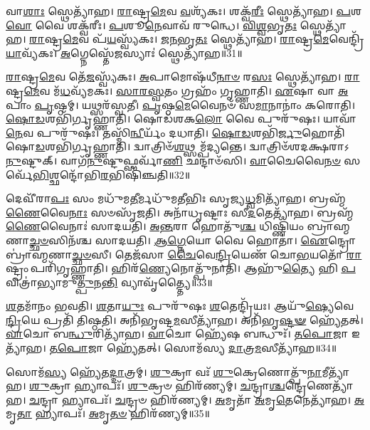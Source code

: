 𑌵𑌾\-\ul{𑌶𑌾𑌃} 𑌸𑍍𑌥𑍇𑌤𑍍𑌯𑌾᳴𑌹।
\-\ul{𑌰𑌾}\-𑌷𑍍𑌟𑍍𑌰\-\ul{𑌮𑍇}\-𑌵 \ul{𑌵}\-𑌶𑍍𑌯᳴𑌕𑌃।
𑌶𑌕𑍍𑌵᳴\-\ul{𑌰𑍀𑌃} 𑌸𑍍𑌥𑍇𑌤𑍍𑌯𑌾᳴𑌹।
\-\ul{𑌪}\-𑌶\-\ul{𑌵𑍋} 𑌵𑍈 𑌶𑌕𑍍𑌵᳴𑌰𑍀𑌃।
\-\ul{𑌪}\-𑌶𑍂\-\ul{𑌨𑍇}\-𑌵𑌾𑌵᳴ 𑌰𑍁𑌨𑍍𑌧𑍇।
\-\ul{𑌵𑌿}\-\-\ul{𑌶𑍍𑌵}\-𑌭𑍃\-\ul{𑌤𑌃} 𑌸𑍍𑌥𑍇𑌤𑍍𑌯𑌾᳴𑌹।
\-\ul{𑌰𑌾}\-𑌷𑍍𑌟𑍍𑌰\-\ul{𑌮𑍇}\-𑌵 𑌪᳴\-\ul{𑌯}\-𑌸𑍍𑌵𑍍𑌯᳴𑌕𑌃।
\-\ul{𑌜}\-\-\ul{𑌨}\-𑌭𑍃\-\ul{𑌤𑌃} 𑌸𑍍𑌥𑍇𑌤𑍍𑌯𑌾᳴𑌹।
\-\ul{𑌰𑌾}\-𑌷𑍍𑌟𑍍𑌰\-\ul{𑌮𑍇}\-𑌵𑍇𑌨𑍍𑌦𑍍𑌰𑌿᳴\-\ul{𑌯𑌾}\-𑌵𑍍𑌯᳴𑌕𑌃।
\-\ul{𑌅}\-𑌗𑍍𑌨𑍇𑌸𑍍𑌤𑍇᳴\-\ul{𑌜}\-𑌸𑍍𑌯𑌾𑌃॑ 𑌸𑍍𑌥𑍇𑌤𑍍𑌯𑌾᳴𑌹॥31॥

\-\ul{𑌰𑌾}\-𑌷𑍍𑌟𑍍𑌰\-\ul{𑌮𑍇}\-𑌵 𑌤𑍇᳴\-\ul{𑌜}\-𑌸𑍍𑌵𑍍𑌯᳴𑌕𑌃।
\-\ul{𑌅}\-𑌪𑌾𑌮𑍋𑌷᳴𑌧𑍀\-\ul{𑌨𑌾}\-\-\ul{𑍞} 𑌰\-\ul{𑌸𑌃} 𑌸𑍍𑌥𑍇𑌤𑍍𑌯𑌾᳴𑌹।
\-\ul{𑌰𑌾}\-𑌷𑍍𑌟𑍍𑌰\-\ul{𑌮𑍇}\-𑌵 𑌮᳴\-\ul{𑌧}\-𑌵𑍍𑌯᳴𑌮𑌕𑌃।
\-\ul{𑌸𑌾}\-\-\ul{𑌰}\-\-\ul{𑌸𑍍𑌵}\-𑌤𑌂 𑌗𑍍𑌰𑌹𑌂᳴ 𑌗𑍃𑌹𑍍𑌣𑌾𑌤𑌿।
\-\ul{𑌏}\-𑌷𑌾 𑌵𑌾 \ul{𑌅}\-𑌪𑌾𑌂 \ul{𑌪𑍃}\-𑌷𑍍𑌠𑌮𑍍।
𑌯𑌥𑍍𑌸𑌰᳴𑌸𑍍𑌵𑌤𑍀।
\-\ul{𑌪𑍃}\-𑌷𑍍𑌠\-\ul{𑌮𑍇}\-𑌵𑍈𑌨𑍞᳴ 𑌸\-\ul{𑌮𑌾}\-𑌨𑌾𑌨𑌾𑌂॑ 𑌕𑌰𑍋𑌤𑌿।
\-\ul{𑌷𑍋}\-\-\ul{𑌡}\-𑌶𑌭𑌿᳴𑌰𑍍𑌗𑍃𑌹𑍍𑌣𑌾𑌤𑌿।
𑌷𑍋𑌡᳴𑌶𑌕\-\ul{𑌲𑍋} 𑌵𑍈 𑌪𑍁𑌰𑍁᳴𑌷𑌃।
𑌯𑌾𑌵𑌾᳴\-\ul{𑌨𑍇}\-𑌵 𑌪𑍁𑌰𑍁᳴𑌷𑌃।
𑌤𑌸𑍍𑌮𑌿᳴\-\ul{𑌨𑍍𑌵𑍀}\-𑌰𑍍𑌯𑌂᳴ 𑌦𑌧𑌾𑌤𑌿।
\-\ul{𑌷𑍋}\-\-\ul{𑌡}\-𑌶𑌭𑌿᳴\-\ul{𑌰𑍍𑌜𑍁}\-𑌹𑍋𑌤𑌿᳴ 𑌷𑍋\-\ul{𑌡}\-𑌶𑌭𑌿᳴𑌰𑍍𑌗𑍃𑌹𑍍𑌣𑌾𑌤𑌿।
𑌦𑍍𑌵𑌾𑌤𑍍𑌰𑌿𑍞᳴\-\ul{𑌶}\-𑌥𑍍𑌸𑌮𑍍𑌪᳴𑌦𑍍𑌯𑌨𑍍𑌤𑍇।
𑌦𑍍𑌵𑌾𑌤𑍍𑌰𑌿𑍞᳴𑌶𑌦𑌕𑍍𑌷𑌰𑌾\-𑌽\-\ul{𑌨𑍁}\-𑌷𑍍𑌟𑍁𑌕𑍍।
𑌵𑌾𑌗᳴\-\ul{𑌨𑍁}\-𑌷𑍍𑌟𑍁𑌫𑍍𑌸𑌰𑍍𑌵𑌾᳴\-\ul{𑌣𑌿} 𑌛𑌨𑍍𑌦𑌾𑍞᳴𑌸𑌿।
\-\ul{𑌵𑌾}\-𑌚𑍈𑌵𑍈\-\ul{𑌨}\-\-\ul{𑍞} 𑌸𑌰𑍍𑌵𑍇᳴\-\ul{𑌭𑌿}\-𑌶𑍍𑌛𑌨𑍍𑌦𑍋᳴𑌭𑌿\-\ul{𑌰}\-𑌭𑌿𑌷𑌿᳴𑌞𑍍𑌚𑌤𑌿॥32॥\anuvakamend[\-\ul{𑌊}\-𑌰𑍍𑌮𑌿𑌰𑌿𑌤𑍍𑌯𑌾᳴\-\ul{𑌹} 𑌸𑍂𑌰𑍍𑌯᳴𑌵𑌰𑍍𑌚\-\ul{𑌸𑌃} 𑌸𑍍𑌥𑍇𑌤𑍍𑌯𑌾᳴𑌹 𑌬𑍍𑌰𑌹𑍍𑌮𑌵\-\ul{𑌰𑍍𑌚}\-𑌸𑍍𑌯᳴𑌕𑌸𑍍𑌤𑍇\-\ul{𑌜}\-𑌸𑍍𑌯𑌾𑌃॑ 𑌸𑍍𑌥𑍇𑌤𑍍𑌯𑌾᳴\-\ul{𑌹𑍈}\-𑌵 𑌪𑍁𑌰𑍁᳴\-\ul{𑌷𑌃} 𑌷𑌟𑍍 𑌚᳴]

𑌦𑍇𑌵𑍀᳴𑌰𑌾\-\ul{𑌪𑌃} 𑌸𑌂 𑌮𑌧𑍁᳴𑌮\-\ul{𑌤𑍀}\-𑌰𑍍𑌮𑌧𑍁᳴𑌮𑌤𑍀𑌭𑌿𑌃 𑌸𑍃𑌜𑍍𑌯\-\ul{𑌧𑍍𑌵}\-𑌮𑌿𑌤𑍍𑌯𑌾᳴𑌹।
𑌬𑍍𑌰𑌹𑍍𑌮᳴\-\ul{𑌣𑍈}\-𑌵𑍈\-\ul{𑌨𑌾𑌃} 𑌸𑍞𑌸𑍃᳴𑌜𑌤𑌿।
𑌅𑌨𑌾᳴𑌧𑍃𑌷𑍍𑌟𑌾𑌃 𑌸𑍀\-\ul{𑌦}\-𑌤𑍇𑌤𑍍𑌯𑌾᳴𑌹।
𑌬𑍍𑌰𑌹𑍍𑌮᳴\-\ul{𑌣𑍈}\-𑌵𑍈𑌨𑌾𑌃॑ 𑌸𑌾𑌦𑌯𑌤𑌿।
\-\ul{𑌅}\-\-\ul{𑌨𑍍𑌤}\-𑌰𑌾 𑌹𑍋𑌤𑍁᳴\-\ul{𑌶𑍍𑌚} 𑌧𑌿𑌷𑍍𑌣𑌿᳴𑌯𑌂 𑌬𑍍𑌰𑌾𑌹𑍍𑌮𑌣𑌾\-\ul{𑌚𑍍𑌛}\-\-\ul{𑍞}\-𑌸𑌿𑌨᳴𑌶𑍍𑌚 𑌸𑌾𑌦𑌯𑌤𑌿।
\-\ul{𑌆}\-\-\ul{𑌗𑍍𑌨𑍇}\-𑌯𑍋 𑌵𑍈 𑌹𑍋𑌤𑌾॑।
\-\ul{𑌐}\-𑌨𑍍𑌦𑍍𑌰𑍋 𑌬𑍍𑌰𑌾॑𑌹𑍍𑌮𑌣𑌾\-\ul{𑌚𑍍𑌛}\-\-\ul{𑍞}\-𑌸𑍀।
𑌤𑍇𑌜᳴𑌸𑌾 \ul{𑌚𑍈}\-𑌵𑍇\-\ul{𑌨𑍍𑌦𑍍𑌰𑌿}\-𑌯𑍇𑌣᳴ 𑌚𑍋\-\ul{𑌭}\-𑌯𑌤𑍋᳴ \ul{𑌰𑌾}\-𑌷𑍍𑌟𑍍𑌰𑌂 𑌪𑌰𑌿᳴𑌗𑍃𑌹𑍍𑌣𑌾𑌤𑌿।
𑌹𑌿𑌰᳴\-\ul{𑌣𑍍𑌯𑍇}\-𑌨𑍋𑌤𑍍𑌪𑍁᳴𑌨𑌾𑌤𑌿।
𑌆𑌹𑍁᳴\-\ul{𑌤𑍍𑌯𑍈} 𑌹𑌿 \ul{𑌪}\-𑌵𑌿𑌤𑍍𑌰𑌾॑𑌭𑍍𑌯𑌾𑌮𑍁\-\ul{𑌤𑍍𑌪𑍁}\-𑌨\-\ul{𑌨𑍍𑌤𑌿} 𑌵𑍍𑌯𑌾𑌵𑍃᳴𑌤𑍍𑌤𑍍𑌯𑍈॥33॥

\-\ul{𑌶}\-𑌤𑌮𑌾᳴𑌨𑌂 𑌭𑌵𑌤𑌿।
\-\ul{𑌶}\-𑌤𑌾\-\ul{𑌯𑍁𑌃} 𑌪𑍁𑌰𑍁᳴𑌷𑌃 \ul{𑌶}\-𑌤𑍇𑌨𑍍𑌦𑍍𑌰𑌿᳴𑌯𑌃।
𑌆𑌯𑍁᳴\-\ul{𑌷𑍍𑌯𑍇}\-𑌵𑍇\-\ul{𑌨𑍍𑌦𑍍𑌰𑌿}\-𑌯𑍇 𑌪𑍍𑌰𑌤𑌿᳴ 𑌤𑌿𑌷𑍍𑌠𑌤𑌿।
𑌅𑌨𑌿᳴𑌭𑍃𑌷𑍍𑌟\-\ul{𑌮}\-𑌸𑍀𑌤𑍍𑌯𑌾᳴𑌹।
𑌅𑌨𑌿᳴𑌭𑍃\-\ul{𑌷𑍍𑌟}\-\-\ul{𑍟} 𑌹𑍍𑌯𑍇᳴𑌤𑌤𑍍।
\-\ul{𑌵𑌾}\-𑌚𑍋 𑌬\-\ul{𑌨𑍍𑌧𑍁}\-𑌰𑌿𑌤𑍍𑌯𑌾᳴𑌹।
\-\ul{𑌵𑌾}\-𑌚𑍋 𑌹𑍍𑌯𑍇᳴𑌷 𑌬𑌨𑍍𑌧𑍁𑌃᳴।
\-\ul{𑌤}\-\-\ul{𑌪𑍋}\-𑌜𑌾 𑌇𑌤𑍍𑌯𑌾᳴𑌹।
\-\ul{𑌤}\-\-\ul{𑌪𑍋}\-𑌜𑌾 𑌹𑍍𑌯𑍇᳴𑌤𑌤𑍍।
𑌸𑍋𑌮᳴𑌸𑍍𑌯 \ul{𑌦𑌾}\-𑌤𑍍𑌰\-\ul{𑌮}\-𑌸𑍀𑌤𑍍𑌯𑌾᳴𑌹॥34॥

𑌸𑍋𑌮᳴\-\ul{𑌸𑍍𑌯} 𑌹𑍍𑌯𑍇᳴𑌤\-\ul{𑌦𑍍𑌦𑌾}\-𑌤𑍍𑌰𑌮𑍍।
\-\ul{𑌶𑍁}\-𑌕𑍍𑌰𑌾 𑌵𑌃᳴ \ul{𑌶𑍁}\-𑌕𑍍𑌰𑍇𑌣𑍋𑌤𑍍𑌪𑍁᳴\-\ul{𑌨𑌾}\-𑌮𑍀𑌤𑍍𑌯𑌾᳴𑌹।
\-\ul{𑌶𑍁}\-𑌕𑍍𑌰𑌾 𑌹𑍍𑌯𑌾𑌪𑌃᳴।
\-\ul{𑌶𑍁}\-𑌕𑍍𑌰𑍞 𑌹𑌿𑌰᳴𑌣𑍍𑌯𑌮𑍍।
\-\ul{𑌚}\-𑌨𑍍𑌦𑍍𑌰𑌾\-\ul{𑌶𑍍𑌚}\-𑌨𑍍𑌦𑍍𑌰𑍇𑌣𑍇𑌤𑍍𑌯𑌾᳴𑌹।
\-\ul{𑌚}\-𑌨𑍍𑌦𑍍𑌰𑌾 𑌹𑍍𑌯𑌾𑌪𑌃᳴।
\-\ul{𑌚}\-𑌨𑍍𑌦𑍍𑌰𑍞 𑌹𑌿𑌰᳴𑌣𑍍𑌯𑌮𑍍।
\-\ul{𑌅}\-𑌮𑍃𑌤𑌾᳴ \ul{𑌅}\-𑌮𑍃\-\ul{𑌤𑍇}\-𑌨𑍇𑌤𑍍𑌯𑌾᳴𑌹।
\-\ul{𑌅}\-𑌮𑍃\-\ul{𑌤𑌾} 𑌹𑍍𑌯𑌾𑌪𑌃᳴।
\-\ul{𑌅}\-𑌮𑍃\-\ul{𑌤}\-\-\ul{𑍞} 𑌹𑌿𑌰᳴𑌣𑍍𑌯𑌮𑍍॥35॥

